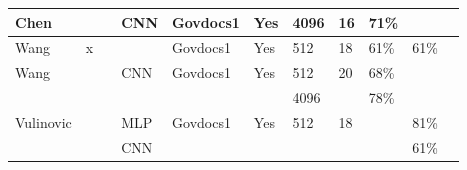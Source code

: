 \begin{table*}[!ht]
{\begin{tabular}{|l|l|l|l|l|l|l|l|l|l|l|}
Chen \cite{chen_file_2018}                     &     &     & CNN  & Govdocs1      & Yes   & 4096     & 16       & 71\%       &           \\ \hline
Wang \cite{wang_sparse_2018}                   & x   &     &      & Govdocs1      & Yes   & 512      & 18       & 61\%       & 61\%      \\ \hline
Wang \cite{wang_file_2018}                     &     &     & CNN  & Govdocs1      & Yes   & 512      & 20       & 68\%       &           \\
                                               &     &     &      &               &       & 4096     &          & 78\%       &           \\ \hline
Vulinovic \cite{vulinovic_neural_2019}         &     &     & MLP  & Govdocs1      & Yes   & 512      & 18       &            & 81\%      \\
                                               &     &     & CNN  &               &       &          &          &            & 61\%      \\ \hline
\end{tabular}}
\end{table*}







